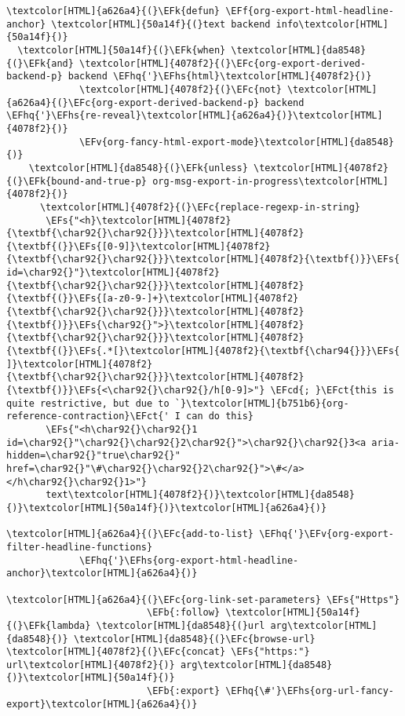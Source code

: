 \documentclass{scrartcl}
\newcommand{\EFk}[1]{\textcolor{EFk}{#1}} %
\newcommand{\EFs}[1]{\textcolor{EFs}{#1}} %
\newcommand{\EFb}[1]{\textcolor{EFb}{#1}} %
\newcommand{\EFct}[1]{\textcolor{EFct}{#1}} %
\newcommand{\EFc}[1]{\textcolor{EFc}{#1}} %
\newcommand{\EFv}[1]{\textcolor{EFv}{#1}} %
\newcommand{\EFf}[1]{\textcolor{EFf}{#1}} %
\newcommand{\EFcd}[1]{\textcolor{EFcd}{#1}} %
\newcommand{\EFhq}[1]{\textcolor{EFhq}{#1}} %
\newcommand{\EFhs}[1]{\textcolor{EFhs}{#1}} %
\begin{document}
\begin{Code}
\begin{Verbatim}[]
\textcolor[HTML]{a626a4}{(}\EFk{defun} \EFf{org-export-html-headline-anchor} \textcolor[HTML]{50a14f}{(}text backend info\textcolor[HTML]{50a14f}{)}
  \textcolor[HTML]{50a14f}{(}\EFk{when} \textcolor[HTML]{da8548}{(}\EFk{and} \textcolor[HTML]{4078f2}{(}\EFc{org-export-derived-backend-p} backend \EFhq{'}\EFhs{html}\textcolor[HTML]{4078f2}{)}
             \textcolor[HTML]{4078f2}{(}\EFc{not} \textcolor[HTML]{a626a4}{(}\EFc{org-export-derived-backend-p} backend \EFhq{'}\EFhs{re-reveal}\textcolor[HTML]{a626a4}{)}\textcolor[HTML]{4078f2}{)}
             \EFv{org-fancy-html-export-mode}\textcolor[HTML]{da8548}{)}
    \textcolor[HTML]{da8548}{(}\EFk{unless} \textcolor[HTML]{4078f2}{(}\EFk{bound-and-true-p} org-msg-export-in-progress\textcolor[HTML]{4078f2}{)}
      \textcolor[HTML]{4078f2}{(}\EFc{replace-regexp-in-string}
       \EFs{"<h}\textcolor[HTML]{4078f2}{\textbf{\char92{}\char92{}}}\textcolor[HTML]{4078f2}{\textbf{(}}\EFs{[0-9]}\textcolor[HTML]{4078f2}{\textbf{\char92{}\char92{}}}\textcolor[HTML]{4078f2}{\textbf{)}}\EFs{ id=\char92{}"}\textcolor[HTML]{4078f2}{\textbf{\char92{}\char92{}}}\textcolor[HTML]{4078f2}{\textbf{(}}\EFs{[a-z0-9-]+}\textcolor[HTML]{4078f2}{\textbf{\char92{}\char92{}}}\textcolor[HTML]{4078f2}{\textbf{)}}\EFs{\char92{}">}\textcolor[HTML]{4078f2}{\textbf{\char92{}\char92{}}}\textcolor[HTML]{4078f2}{\textbf{(}}\EFs{.*[}\textcolor[HTML]{4078f2}{\textbf{\char94{}}}\EFs{ ]}\textcolor[HTML]{4078f2}{\textbf{\char92{}\char92{}}}\textcolor[HTML]{4078f2}{\textbf{)}}\EFs{<\char92{}\char92{}/h[0-9]>"} \EFcd{; }\EFct{this is quite restrictive, but due to `}\textcolor[HTML]{b751b6}{org-reference-contraction}\EFct{' I can do this}
       \EFs{"<h\char92{}\char92{}1 id=\char92{}"\char92{}\char92{}2\char92{}">\char92{}\char92{}3<a aria-hidden=\char92{}"true\char92{}" href=\char92{}"\#\char92{}\char92{}2\char92{}">\#</a> </h\char92{}\char92{}1>"}
       text\textcolor[HTML]{4078f2}{)}\textcolor[HTML]{da8548}{)}\textcolor[HTML]{50a14f}{)}\textcolor[HTML]{a626a4}{)}

\textcolor[HTML]{a626a4}{(}\EFc{add-to-list} \EFhq{'}\EFv{org-export-filter-headline-functions}
             \EFhq{'}\EFhs{org-export-html-headline-anchor}\textcolor[HTML]{a626a4}{)}

\textcolor[HTML]{a626a4}{(}\EFc{org-link-set-parameters} \EFs{"Https"}
                         \EFb{:follow} \textcolor[HTML]{50a14f}{(}\EFk{lambda} \textcolor[HTML]{da8548}{(}url arg\textcolor[HTML]{da8548}{)} \textcolor[HTML]{da8548}{(}\EFc{browse-url} \textcolor[HTML]{4078f2}{(}\EFc{concat} \EFs{"https:"} url\textcolor[HTML]{4078f2}{)} arg\textcolor[HTML]{da8548}{)}\textcolor[HTML]{50a14f}{)}
                         \EFb{:export} \EFhq{\#'}\EFhs{org-url-fancy-export}\textcolor[HTML]{a626a4}{)}


\end{Verbatim}
\end{Code}
\end{document}
